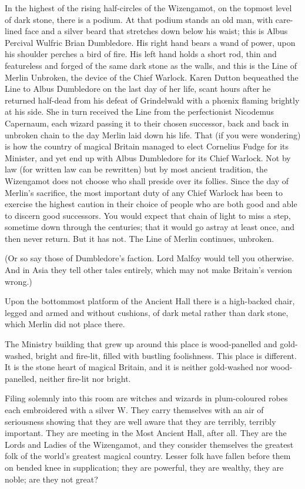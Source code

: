 In the highest of the rising half-circles of the Wizengamot, on the topmost level of dark stone, there is a podium. At that podium stands an old man, with care-lined face and a silver beard that stretches down below his waist; this is Albus Percival Wulfric Brian Dumbledore. His right hand bears a wand of power, upon his shoulder perches a bird of fire. His left hand holds a short rod, thin and featureless and forged of the same dark stone as the walls, and this is the Line of Merlin Unbroken, the device of the Chief Warlock. Karen Dutton bequeathed the Line to Albus Dumbledore on the last day of her life, scant hours after he returned half-dead from his defeat of Grindelwald with a phœnix flaming brightly at his side. She in turn received the Line from the perfectionist Nicodemus Capernaum, each wizard passing it to their chosen successor, back and back in unbroken chain to the day Merlin laid down his life. That (if you were wondering) is how the country of magical Britain managed to elect Cornelius Fudge for its Minister, and yet end up with Albus Dumbledore for its Chief Warlock. Not by law (for written law can be rewritten) but by most ancient tradition, the Wizengamot does not choose who shall preside over its follies. Since the day of Merlin’s sacrifice, the most important duty of any Chief Warlock has been to exercise the highest caution in their choice of people who are both good and able to discern good successors. You would expect that chain of light to miss a step, sometime down through the centuries; that it would go astray at least once, and then never return. But it has not. The Line of Merlin continues, unbroken.

(Or so say those of Dumbledore’s faction. Lord Malfoy would tell you otherwise. And in Asia they tell other tales entirely, which may not make Britain’s version wrong.)

Upon the bottommost platform of the Ancient Hall there is a high-backed chair, legged and armed and without cushions, of dark metal rather than dark stone, which Merlin did not place there.

The Ministry building that grew up around this place is wood-panelled and gold-washed, bright and fire-lit, filled with bustling foolishness. This place is different. It is the stone heart of magical Britain, and it is neither gold-washed nor wood-panelled, neither fire-lit nor bright.

Filing solemnly into this room are witches and wizards in plum-coloured robes each embroidered with a silver W\@. They carry themselves with an air of seriousness showing that they are well aware that they are terribly, terribly important. They are meeting in the Most Ancient Hall, after all. They are the Lords and Ladies of the Wizengamot, and they consider themselves the greatest folk of the world’s greatest magical country. Lesser folk have fallen before them on bended knee in supplication; they are powerful, they are wealthy, they are noble; are they not great?

